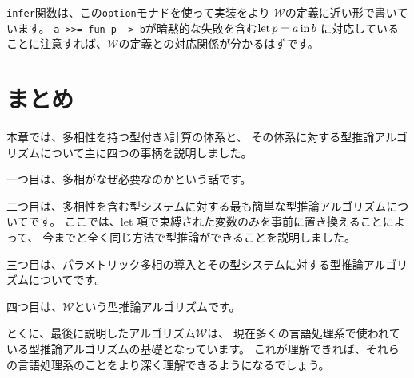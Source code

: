 \texttt{infer}関数は、この\texttt{option}モナドを使って実装をより
$\mathcal W$の定義に近い形で書いています。
\texttt{a >>= fun p -> b}が暗黙的な失敗を含む$\mathrm{let} \, p = a \, \mathrm{in} \, b$
に対応していることに注意すれば、$\mathcal W$の定義との対応関係が分かるはずです。

\section{まとめ}

本章では、多相性を持つ型付き$\lambda$計算の体系と、
その体系に対する型推論アルゴリズムについて主に四つの事柄を説明しました。

一つ目は、多相がなぜ必要なのかという話です。

二つ目は、多相性を含む型システムに対する最も簡単な型推論アルゴリズムについてです。
ここでは、let 項で束縛された変数のみを事前に置き換えることによって、
今までと全く同じ方法で型推論ができることを説明しました。

三つ目は、パラメトリック多相の導入とその型システムに対する型推論アルゴリズムについてです。

四つ目は、$\mathcal W$という型推論アルゴリズムです。

とくに、最後に説明したアルゴリズム$\mathcal W$は、
現在多くの言語処理系で使われている型推論アルゴリズムの基礎となっています。
これが理解できれば、それらの言語処理系のことをより深く理解できるようになるでしょう。

